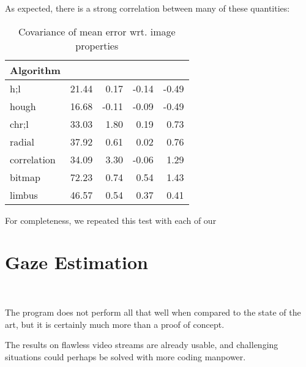 As expected, there is a strong correlation between many of these quantities:
\begin{table}[h]
\centering
\begin{tabular}{l@{\hspace{1.5cm}}D{.}{.}{3.2}D{.}{.}{3.2}D{.}{.}{3.2}D{.}{.}{3.2}}
\toprule
\textbf{Algorithm} &  &  &  & \\
\midrule
h;l & 21.44 & 0.17 & -0.14 & -0.49\\
hough & 16.68 & -0.11 & -0.09 & -0.49\\
chr;l & 33.03 & 1.80 & 0.19 & 0.73\\
radial & 37.92 & 0.61 & 0.02 & 0.76\\
correlation & 34.09 & 3.30 & -0.06 & 1.29\\
bitmap & 72.23 & 0.74 & 0.54 & 1.43\\
limbus & 46.57 & 0.54 & 0.37 & 0.41\\
\bottomrule
\end{tabular}
\caption{Covariance of mean error wrt. image properties}\label{t:algo-covar}
\end{table}

For completeness, we repeated this test with each of our 

\section{Gaze Estimation}
\\

The program does not perform all that well when compared to the state of the art, but it is certainly much more than a proof of concept.

The results on flawless video streams are already usable, and challenging situations could perhaps be solved with more coding manpower.
\todo{\dots}
